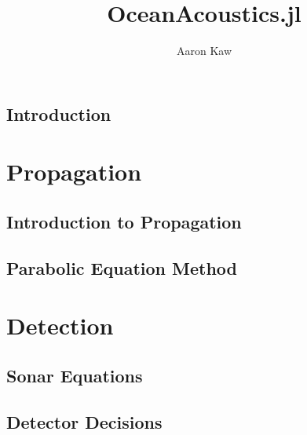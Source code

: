 \documentclass{book}
\title{OceanAcoustics.jl}
\author{Aaron Kaw}
\begin{document}
\maketitle
\tableofcontents

\chapter{Introduction}

\part{Propagation}
\chapter{Introduction to Propagation}

\chapter{Parabolic Equation Method}

\part{Detection}
\chapter{Sonar Equations}
\chapter{Detector Decisions}
\end{document}
